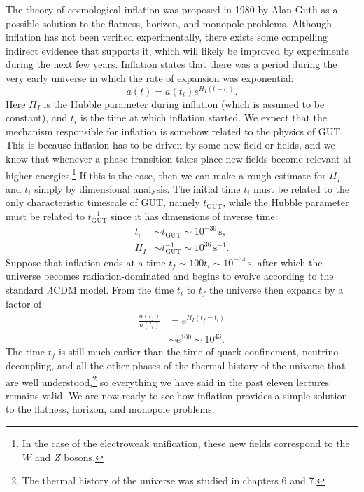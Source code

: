 \documentclass[11pt, a4paper,oneside,openright]{book}
\numberwithin{equation}{section}
\begin{document}
The theory of cosmological inflation was proposed in 1980 by Alan Guth as a possible solution to the flatness, horizon, and monopole problems. Although inflation has not been verified experimentally, there exists some compelling indirect evidence that supports it, which will likely be improved by experiments during the next few years. Inflation states that there was a period during the very early universe in which the rate of expansion was exponential:
\begin{equation} \label{eq:inflation_scalefactor}
a(t)=a(t_i)e^{H_I(t-t_i)}.
\end{equation}
Here $H_I$ is the Hubble parameter during inflation (which is assumed to be constant), and $t_i$ is the time at which inflation started. We expect that the mechanism responsible for inflation is somehow related to the physics of GUT. This is because inflation has to be driven by some new field or fields, and we know that whenever a phase transition takes place new fields become relevant at higher energies.\footnote{In the case of the electroweak unification, these new fields correspond to the $W$ and $Z$ bosons.} If this is the case, then we can make a rough estimate for $H_I$ and $t_i$ simply by dimensional analysis. The initial time $t_i$ must be related to the only characteristic timescale of GUT, namely $t_{\mathrm{GUT}}$, while the Hubble parameter must be related to $t_{\mathrm{GUT}}^{-1}$ since it has dimensions of inverse time:
\begin{equation}
\begin{split}
t_i&\sim t_{\mathrm{GUT}}\sim 10^{-36}\,{\mathrm{s}},\\
H_I&\sim t_{\mathrm{GUT}}^{-1}\sim 10^{36}\,{\mathrm{s^{-1}}}.
\end{split}
\end{equation}
Suppose that inflation ends at a time $t_f\sim 100t_i\sim 10^{-34}\,\mathrm{s}$, after which the universe becomes radiation-dominated and begins to evolve according to the standard $\Lambda$CDM model. From the time $t_i$ to $t_f$ the universe then expands by a factor of
\begin{equation}
\begin{split}
\frac{a(t_f)}{a(t_i)}&=e^{H_I(t_f-t_i)}\\
&\sim e^{100}\sim 10^{43}.
\end{split}
\end{equation}
The time $t_f$ is still much earlier than the time of quark confinement, neutrino decoupling, and all the other phases of the thermal history of the universe that are well understood,\footnote{The thermal history of the universe was studied in chapters 6 and 7.} so everything we have said in the past eleven lectures remains valid. We are now ready to see how inflation provides a simple solution to the flatness, horizon, and monopole problems.
\end{document}
